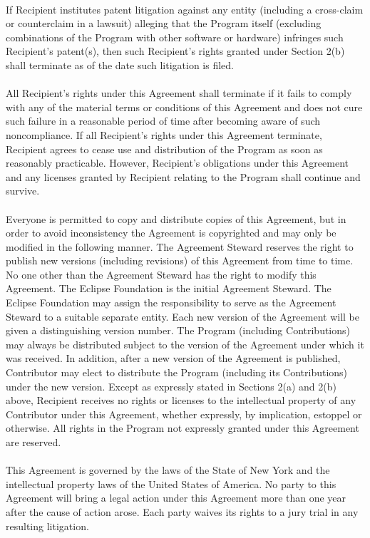 \documentclass[a4paper, 12pt]{book}
\begin{document}
{\\
If Recipient institutes patent litigation against any entity (including a cross-claim or counterclaim in a lawsuit) alleging that the Program itself (excluding combinations of the Program with other software or hardware) infringes such Recipient's patent(s), then such Recipient's rights granted under Section 2(b) shall terminate as of the date such litigation is filed.\\
\\
All Recipient's rights under this Agreement shall terminate if it fails to comply with any of the material terms or conditions of this Agreement and does not cure such failure in a reasonable period of time after becoming aware of such noncompliance. If all Recipient's rights under this Agreement terminate, Recipient agrees to cease use and distribution of the Program as soon as reasonably practicable. However, Recipient's obligations under this Agreement and any licenses granted by Recipient relating to the Program shall continue and survive.\\
\\
Everyone is permitted to copy and distribute copies of this Agreement, but in order to avoid inconsistency the Agreement is copyrighted and may only be modified in the following manner. The Agreement Steward reserves the right to publish new versions (including revisions) of this Agreement from time to time. No one other than the Agreement Steward has the right to modify this Agreement. The Eclipse Foundation is the initial Agreement Steward. The Eclipse Foundation may assign the responsibility to serve as the Agreement Steward to a suitable separate entity. Each new version of the Agreement will be given a distinguishing version number. The Program (including Contributions) may always be distributed subject to the version of the Agreement under which it was received. In addition, after a new version of the Agreement is published, Contributor may elect to distribute the Program (including its Contributions) under the new version. Except as expressly stated in Sections 2(a) and 2(b) above, Recipient receives no rights or licenses to the intellectual property of any Contributor under this Agreement, whether expressly, by implication, estoppel or otherwise. All rights in the Program not expressly granted under this Agreement are reserved.\\
\\
This Agreement is governed by the laws of the State of New York and the intellectual property laws of the United States of America. No party to this Agreement will bring a legal action under this Agreement more than one year after the cause of action arose. Each party waives its rights to a jury trial in any resulting litigation.\\
\\

}
\end{document}

